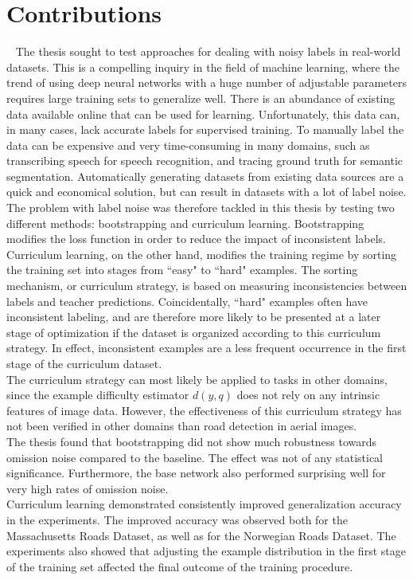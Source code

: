 \section{Contributions}~\label{cont}
\label{sec:Contributions}
The thesis sought to test approaches for dealing with noisy labels in real-world datasets. This is a compelling inquiry in the field of machine learning, where the trend of using deep neural networks with a huge number of adjustable parameters requires large training sets to generalize well. There is an abundance of existing data available online that can be used for learning. Unfortunately, this data can, in many cases, lack accurate labels for supervised training. To manually label the data can be expensive and very time-consuming in many domains, such as transcribing speech for speech recognition, and tracing ground truth for semantic segmentation. Automatically generating datasets from existing data sources are a quick and economical solution, but can result in datasets with a lot of label noise.\\

The problem with label noise was therefore tackled in this thesis by testing two different methods: bootstrapping and curriculum learning. Bootstrapping modifies the loss function in order to reduce the impact of inconsistent labels. Curriculum learning, on the other hand,  modifies the training regime by sorting the training set into stages from ``easy" to ``hard" examples. The sorting mechanism, or curriculum strategy, is based on measuring inconsistencies between labels and teacher predictions. Coincidentally, ``hard" examples often have inconsistent labeling, and are therefore more likely to be presented at a later stage of optimization if the dataset is organized according to this curriculum strategy. In effect, inconsistent examples are a less frequent occurrence in the first stage of the curriculum dataset.\\
 
The curriculum strategy can most likely be applied to tasks in other domains, since the example difficulty estimator $d(y,q)$ does not rely on any intrinsic features of image data. However, the effectiveness of this curriculum strategy has not been verified in other domains than road detection in aerial images.\\

The thesis found that bootstrapping did not show much robustness towards omission noise compared to the baseline. The effect was not of any statistical significance. Furthermore, the base network also performed surprising well for very high rates of omission noise. \\

Curriculum learning demonstrated consistently improved generalization accuracy in the experiments. The improved accuracy was observed both for the Massachusetts Roads Dataset, as well as for the Norwegian Roads Dataset. The experiments also showed that adjusting the example distribution in the first stage of the training set affected the final outcome of the training procedure.\\

